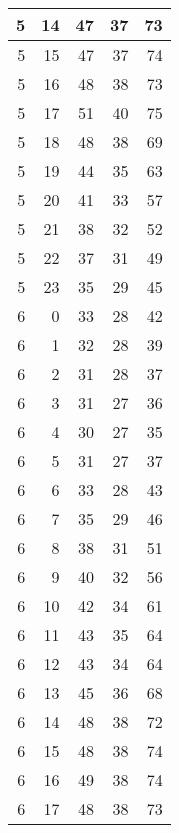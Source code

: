 \begin{longtable}{|r|r|r|r|r|}
    \hline
    5     & 14    & 47    & 37    & 73 \\
    \hline
    5     & 15    & 47    & 37    & 74 \\
    \hline
    5     & 16    & 48    & 38    & 73 \\
    \hline
    5     & 17    & 51    & 40    & 75 \\
    \hline
    5     & 18    & 48    & 38    & 69 \\
    \hline
    5     & 19    & 44    & 35    & 63 \\
    \hline
    5     & 20    & 41    & 33    & 57 \\
    \hline
    5     & 21    & 38    & 32    & 52 \\
    \hline
    5     & 22    & 37    & 31    & 49 \\
    \hline
    5     & 23    & 35    & 29    & 45 \\
    \hline
    6     & 0     & 33    & 28    & 42 \\
    \hline
    6     & 1     & 32    & 28    & 39 \\
    \hline
    6     & 2     & 31    & 28    & 37 \\
    \hline
    6     & 3     & 31    & 27    & 36 \\
    \hline
    6     & 4     & 30    & 27    & 35 \\
    \hline
    6     & 5     & 31    & 27    & 37 \\
    \hline
    6     & 6     & 33    & 28    & 43 \\
    \hline
    6     & 7     & 35    & 29    & 46 \\
    \hline
    6     & 8     & 38    & 31    & 51 \\
    \hline
    6     & 9     & 40    & 32    & 56 \\
    \hline
    6     & 10    & 42    & 34    & 61 \\
    \hline
    6     & 11    & 43    & 35    & 64 \\
    \hline
    6     & 12    & 43    & 34    & 64 \\
    \hline
    6     & 13    & 45    & 36    & 68 \\
    \hline
    6     & 14    & 48    & 38    & 72 \\
    \hline
    6     & 15    & 48    & 38    & 74 \\
    \hline
    6     & 16    & 49    & 38    & 74 \\
    \hline
    6     & 17    & 48    & 38    & 73 \\

\end{longtable}
